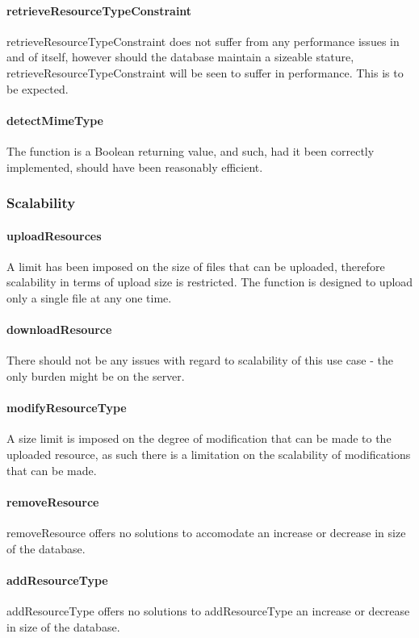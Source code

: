 \documentclass[a4paper]{article}
\begin{document}
\paragraph{retrieveResourceTypeConstraint}
retrieveResourceTypeConstraint does not suffer from any performance issues in and of itself, however should the database maintain a sizeable stature, retrieveResourceTypeConstraint will be seen to suffer in performance. This is to be expected.

\paragraph{detectMimeType}
The function is a Boolean returning value, and such, had it been correctly implemented, should have been reasonably efficient. 

\subsubsection {Scalability}

\paragraph{uploadResources}
A limit has been imposed on the size of files that can be uploaded, therefore scalability in terms of upload size is restricted. The function is designed to upload only a single file at any one time.

\paragraph{downloadResource}
There should not be any issues with regard to scalability of this use case - the only burden might be on the server.

\paragraph{modifyResourceType}
A size limit is imposed on the degree of modification that can be made to the uploaded resource, as such there is a limitation on the scalability of modifications that can be made.

\paragraph{removeResource}
removeResource offers no solutions to accomodate an increase or decrease in size of the database.

\paragraph{addResourceType}
addResourceType offers no solutions to addResourceType an increase or decrease in size of the database.
\end{document}
